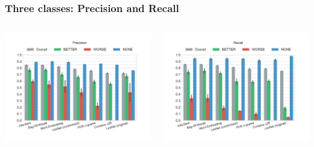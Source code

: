 \documentclass[11pt,aspectratio=169,usenames,dvipsnames]{beamer}
\begin{document}
    \begin{frame}[t]
        \frametitle{Three classes: Precision and Recall}
        \begin{columns}[t]
            \column{2in}
            \centerline{\includegraphics[scale=0.31,trim={2cm 0 0 0},clip]{images/experiments/p-precision-False}}
            \column{2in}
            \centerline{\includegraphics[scale=0.31,trim={0 0 2cm 0},clip]{images/experiments/p-recall-False}}

        \end{columns}
    \end{frame}
\end{document}
